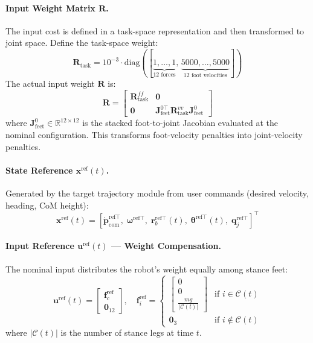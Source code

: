 \documentclass[11pt,a4paper]{article}
\newcommand{\R}{\mathbb{R}}
\begin{document}
\paragraph{Input Weight Matrix $\bm{R}$.}
The input cost is defined in a task-space representation and then transformed to joint space. Define the task-space weight:
\begin{equation}
	\bm{R}_{\text{task}} = 10^{-3} \cdot \text{diag}([\underbrace{1, \ldots, 1}_{12 \text{ forces}},\,
		\underbrace{5000, \ldots, 5000}_{12 \text{ foot velocities}}])
\end{equation}
The actual input weight $\bm{R}$ is:
\begin{equation}
	\bm{R} = \begin{bmatrix}
		\bm{R}_{\text{task}}^{ff} & \bm{0}                                                                          \\
		\bm{0}                    & \bm{J}_{\text{feet}}^{0\top} \bm{R}_{\text{task}}^{vv} \bm{J}_{\text{feet}}^{0}
	\end{bmatrix}
\end{equation}
where $\bm{J}_{\text{feet}}^{0} \in \R^{12 \times 12}$ is the stacked foot-to-joint Jacobian evaluated at the nominal configuration. This transforms foot-velocity penalties into joint-velocity penalties.

\paragraph{State Reference $\bm{x}^{\text{ref}}(t)$.}
Generated by the target trajectory module from user commands (desired velocity, heading, CoM height):
\begin{equation}
	\bm{x}^{\text{ref}}(t) = [\dot{\bm{p}}_{\text{com}}^{\text{ref}\top},\; \bm{\omega}^{\text{ref}\top},\; \bm{r}_b^{\text{ref}\top}(t),\; \bm{\theta}^{\text{ref}\top}(t),\; \bm{q}_j^{\text{ref}\top}]^\top
\end{equation}

\paragraph{Input Reference $\bm{u}^{\text{ref}}(t)$ --- Weight Compensation.}
The nominal input distributes the robot's weight equally among stance feet:
\begin{equation}
	\bm{u}^{\text{ref}}(t) = \begin{bmatrix} \bm{f}_c^{\text{ref}} \\ \bm{0}_{12} \end{bmatrix}, \quad
	\bm{f}_i^{\text{ref}} = \begin{cases}
		\displaystyle \begin{bmatrix} 0 \\ 0 \\ \frac{mg}{|\mathcal{C}(t)|} \end{bmatrix} & \text{if } i \in \mathcal{C}(t)    \\[8pt]
		\bm{0}_3                                                                                   & \text{if } i \notin \mathcal{C}(t)
	\end{cases}
\end{equation}
where $|\mathcal{C}(t)|$ is the number of stance legs at time $t$.
\end{document}
